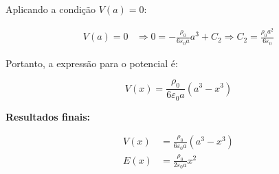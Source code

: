 \documentclass[a4paper,12pt]{article}
\begin{document}
\begin{flushleft}
Aplicando a condição \( V(a) = 0 \):

\begin{align}
V(a) = 0 &\Rightarrow 0 = -\frac{\rho_0}{6\varepsilon_0 a} a^3 + C_2 \Rightarrow C_2 = \frac{\rho_0 a^2}{6\varepsilon_0}
\end{align}

Portanto, a expressão para o potencial é:

\begin{equation}
V(x) = \frac{\rho_0}{6\varepsilon_0 a} \left( a^3 - x^3 \right)
\end{equation}

\bigskip

\noindent\textbf{Resultados finais:}

\begin{equation}
\boxed{
\begin{aligned}
V(x) &= \frac{\rho_0}{6\varepsilon_0 a} \left( a^3 - x^3 \right) \\
E(x) &= \frac{\rho_0}{2\varepsilon_0 a} x^2
\end{aligned}
}
\end{equation}
\end{flushleft}
\end{document}
